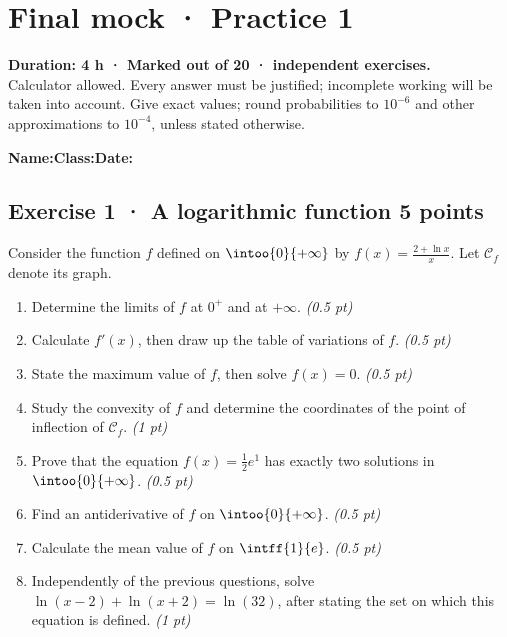 \mxnewpage{}\label{sujet:9-1}

\section*{Final mock · Practice 1}


\textbf{Duration: 4 h · Marked out of 20 ·  independent exercises.}\\Calculator allowed. Every answer must be justified; incomplete working will be taken into account. Give exact values; round probabilities to $10^{-6}$ and other approximations to $10^{-4}$, unless stated otherwise.

\smallskip\textbf{Name:}\enspace\dotfill\quad\textbf{Class:}\enspace\dotfill\quad\textbf{Date:}\enspace\dotfill

\subsection*{Exercise 1 · A logarithmic function \hfill 5 points}Consider the function $f$ defined on $\intoo{0}{+\infty}$ by $f(x)=\frac{2+\ln x}x$. Let $\mathcal C_f$ denote its graph.

\begin{enumerate}

\item Determine the limits of $f$ at $0^+$ and at $+\infty$. \hfill\textit{(0.5 pt)}

\item Calculate $f' (x)$, then draw up the table of variations of $f$. \hfill\textit{(0.5 pt)}

\item State the maximum value of $f$, then solve $f(x)=0$. \hfill\textit{(0.5 pt)}

\item Study the convexity of $f$ and determine the coordinates of the point of inflection of $\mathcal C_f$. \hfill\textit{(1 pt)}

\item Prove that the equation $f(x)=\frac12 e^{1}$ has exactly two solutions in $\intoo{0}{+\infty}$. \hfill\textit{(0.5 pt)}

\item Find an antiderivative of $f$ on $\intoo{0}{+\infty}$. \hfill\textit{(0.5 pt)}

\item Calculate the mean value of $f$ on $\intff{1}{e}$. \hfill\textit{(0.5 pt)}

\item Independently of the previous questions, solve $\ln(x-2)+\ln(x+2)=\ln(32)$, after stating the set on which this equation is defined. \hfill\textit{(1 pt)}

\end{enumerate}

